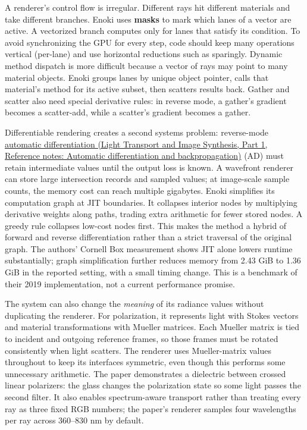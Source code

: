 A renderer's control flow is irregular. Different rays hit different materials and take different branches. Enoki uses \textbf{masks} to mark which lanes of a vector are active. A vectorized branch computes only for lanes that satisfy its condition. To avoid synchronizing the GPU for every step, code should keep many operations vertical (per-lane) and use horizontal reductions such as  sparingly. Dynamic method dispatch is more difficult because a vector of rays may point to many material objects. Enoki groups lanes by unique object pointer, calls that material's method for its active subset, then scatters results back. Gather and scatter also need special derivative rules: in reverse mode, a gather's gradient becomes a scatter-add, while a scatter's gradient becomes a gather.

Differentiable rendering creates a second systems problem: reverse-mode \href{../04-Light-Transport-and-Image-Synthesis-P01/main.pdf\#nameddest=appendix-40df0855b4a7}{automatic differentiation (Light Transport and Image Synthesis, Part 1, Reference notes: Automatic differentiation and backpropagation)} (AD) must retain intermediate values until the output loss is known. A wavefront renderer can store large intersection records and sampled values; at image-scale sample counts, the memory cost can reach multiple gigabytes. Enoki simplifies its computation graph at JIT boundaries. It collapses interior nodes by multiplying derivative weights along paths, trading extra arithmetic for fewer stored nodes. A greedy rule collapses low-cost nodes first. This makes the method a hybrid of forward and reverse differentiation rather than a strict traversal of the original graph. The authors' Cornell Box measurement shows JIT alone lowers runtime substantially; graph simplification further reduces memory from 2.43 GiB to 1.36 GiB in the reported setting, with a small timing change. This is a benchmark of their 2019 implementation, not a current performance promise.

The system can also change the \emph{meaning} of its radiance values without duplicating the renderer. For polarization, it represents light with Stokes vectors and material transformations with Mueller matrices. Each Mueller matrix is tied to incident and outgoing reference frames, so those frames must be rotated consistently when light scatters. The renderer uses Mueller-matrix values throughout to keep its interfaces symmetric, even though this performs some unnecessary arithmetic. The paper demonstrates a dielectric between crossed linear polarizers: the glass changes the polarization state so some light passes the second filter. It also enables spectrum-aware transport rather than treating every ray as three fixed RGB numbers; the paper's renderer samples four wavelengths per ray across 360--830 nm by default.

